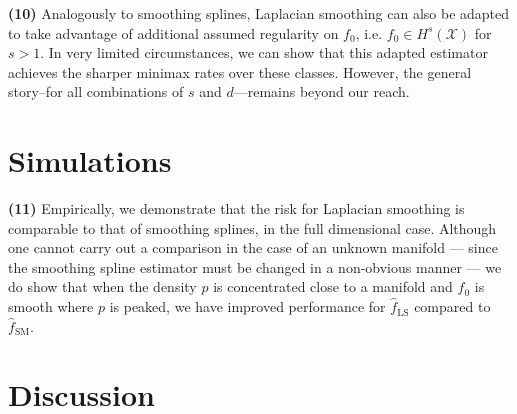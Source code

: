 \documentclass{article}
\newcommand{\1}{\mathbf{1}}
\newcommand{\Xset}{\mathcal{X}}
\newcommand{\mc}[1]{\mathcal{#1}}
\newcommand{\wh}[1]{\widehat{#1}}
\newcommand{\LS}{\mathrm{LS}}
\theoremstyle{alden}
\theoremstyle{aldenthm}
\theoremstyle{definition}
\theoremstyle{remark}
\begin{document}
\quad \textbf{(10)} Analogously to smoothing splines, Laplacian smoothing can also be adapted to take advantage of additional assumed regularity on $f_0$, i.e. $f_0 \in H^s(\mc{\Xset})$ for $s > 1$. In very limited circumstances, we can show that this adapted estimator achieves the sharper minimax rates over these classes. However, the general story--for all combinations of $s$ and $d$---remains beyond our reach.

\section{Simulations}

\quad \textbf{(11)} Empirically, we demonstrate that the risk for Laplacian smoothing is comparable to that of smoothing splines, in the full dimensional case. Although one cannot carry out a comparison in the case of an unknown manifold --- since the smoothing spline estimator must be changed in a non-obvious manner --- we do show that when the density $p$ is concentrated close to a manifold and $f_0$ is smooth where $p$ is peaked, we have improved performance for $\wh{f}_{\LS}$ compared to $\wh{f}_{\mathrm{SM}}$. 

\section{Discussion}

\clearpage


 
\end{document}
